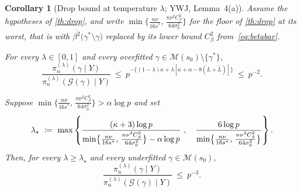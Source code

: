 \documentclass[aos]{imsart}
\newcommand{\Ltil}{\widetilde{L}}
\newcommand{\gainfloorsm}{%
    \min\bigl\{\tfrac{n\nu}{16s^{\ast}},\,
    \tfrac{n\nu^{2}C_\beta^{2}}{64\sigma_0^{2}}\bigr\}}
\newcommand{\betabar}[1]{\overline{\beta^{2}}\bigl(#1\bigr)}
\theoremstyle{plain}
\newtheorem{corollary}{Corollary}[section]
\theoremstyle{definition}
\begin{document}
    \begin{corollary}[Drop bound at temperature $\lambda$; YWJ, Lemma~4(a)]
        \label{cor:critical}
        Assume the hypotheses of \cref{th:drop}, and write $\gainfloorsm$
        for the floor of \cref{th:drop} at its worst, that is with
        $\betabar{\gamma^{\ast}\setminus\gamma}$ replaced by its lower bound
        $C_\beta^{2}$ from~\eqref{eq:betabar}.
        \begin{equivcond}
            \item\label{it:crit_over} For every $\lambda\in[0,1]$ and every
            overfitted $\gamma\in\mathscr{M}(s_0)\setminus\{\gamma^{\ast}\}$,
            \begin{equation}
                \label{eq:overconc}
                \frac{\pi_n^{(\lambda)}(\gamma\mid Y)}
                {\pi_n^{(\lambda)}(\mathcal{G}(\gamma)\mid Y)}
                \ \leq\ p^{-\{(1-\lambda)\kappa
                +\lambda[\kappa+\alpha-8(L+\Ltil)]\}}
                \ \leq\ p^{-2} .
            \end{equation}
            \item\label{it:crit_under} Suppose
            $\gainfloorsm>\alpha\log p$ and set
            \begin{equation}
                \label{eq:lambdastar}
                \lambda_\star\ \coloneq\ \max\left\{
                                                 \frac{(\kappa+3)\log p}
                                                 {\gainfloorsm-\alpha\log p}\ ,\quad
                                                 \frac{6\log p}{\gainfloorsm}\right\} .
            \end{equation}
            Then, for every $\lambda\geq\lambda_\star$ and every underfitted
            $\gamma\in\mathscr{M}(s_0)$,
            \begin{equation}
                \label{eq:underconc}
                \frac{\pi_n^{(\lambda)}(\gamma\mid Y)}
                {\pi_n^{(\lambda)}(\mathcal{G}(\gamma)\mid Y)}
                \ \leq\ p^{-3} .
            \end{equation}
        \end{equivcond}
    \end{corollary}
\end{document}
